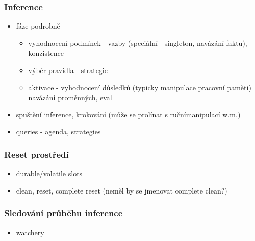 \subsubsection{Inference}
\begin{framed}
  \begin{itemize}
    \item fáze podrobně
    \begin{itemize}
      \item vyhodnocení podmínek - vazby (speciální - singleton, navázání faktu),
        konzistence
      \item výběr pravidla - strategie
      \item aktivace - vyhodnocení důsledků (typicky manipulace pracovní paměti)
        navázání proměnných, eval
    \end{itemize}
    \item spuštění inference, krokování (může se prolínat s ručnímanipulací w.m.)
    \item queries - agenda, strategies
  \end{itemize}
\end{framed}

\subsubsection{Reset prostředí}
\begin{framed}
  \begin{itemize}
    \item durable/volatile slots
    \item clean, reset, complete reset (neměl by se jmenovat complete clean?)
  \end{itemize}
\end{framed}

\subsubsection{Sledování průběhu inference}
\begin{framed}
  \begin{itemize}
    \item watchery
  \end{itemize}
\end{framed}

